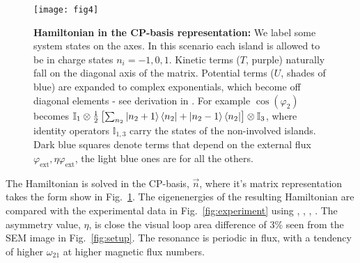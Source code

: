 \begin{figure}[ht]
  \centering \texttt{[image: fig4]}
  \caption{\small \textbf{Hamiltonian in the CP-basis representation:} We label some system states on the axes. In this scenario each island is allowed to be in charge states $ n_{i} = -1, 0 ,1 $. Kinetic  terms ($ {T} $, purple) naturally fall on  the diagonal axis of  the matrix. Potential terms ($ U $, shades of blue) are expanded to complex exponentials, which become off diagonal elements - see derivation in \cite{phase}. For example $ \cos(\varphi_{2}) $ becomes $ \mathbb{I}_{1}\otimes\frac{1}{2}\left[\sum_{n_2}\ket{n_2+1}\bra{n_2} + \ket{n_2-1}\bra{n_2} \right]\otimes\mathbb{I}_{3}  $, where identity operators $ \mathbb{I}_{1,3} $ carry the states of the non-involved islands. Dark blue squares denote terms that depend on the external flux $\varphi_{\text{ext}}, \eta\varphi_{\text{ext}}$, the light blue ones are for all the others.
    \label{fig:matrix_representation} }
\end{figure}

The Hamiltonian is solved in the CP-basis,  $\vec{n} $, where it's matrix representation takes
the form  show in  Fig.~\ref{fig:matrix_representation}.  The  eigenenergies of  the resulting
Hamiltonian  are  compared  with  the experimental  data  in  Fig.~\ref{fig:experiment}  using
,  , ,  .
The asymmetry value, $ \eta $, is close the  visual loop area difference of 3\% seen from the SEM
image in Fig.~\ref{fig:setup}.  The  resonance is periodic in flux, with  a tendency of higher
$\omega_{21}$ at higher magnetic flux numbers.


